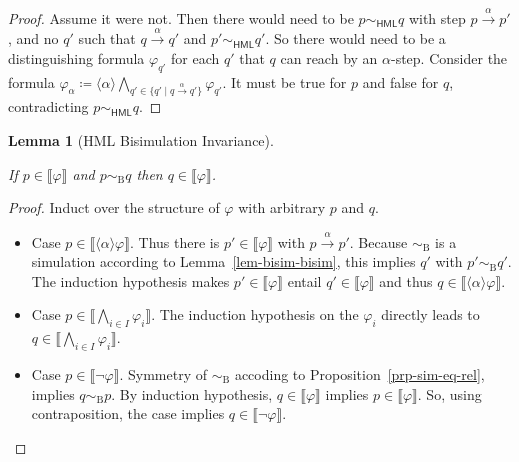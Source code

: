 \documentclass[
  a4paper,
]{report}
\providecommand{\tightlist}{%
  \setlength{\itemsep}{0pt}\setlength{\parskip}{0pt}}\usepackage{longtable,booktabs,array}
\theoremstyle{plain}
\theoremstyle{plain}
\theoremstyle{definition}
\theoremstyle{plain}
\newtheorem{lemma}{Lemma}[section]
\theoremstyle{definition}
\theoremstyle{remark}
\begin{document}
\begin{proof}
Assume it were not. Then there would need to be
\(p \sim_{\textsf{HML}} q\) with step \(p \xrightarrow{\alpha }p'\), and
no \(q'\) such that \(q \xrightarrow{α} q'\) and
\(p' \sim_{\textsf{HML}} q'\). So there would need to be a
distinguishing formula \(φ_{q'}\) for each \(q'\) that \(q\) can reach
by an \(α\)-step. Consider the formula
\(φ_α ≔ \langle α \rangle\textstyle\bigwedge_{q' \in \{q' \mid q \xrightarrow{α} q'\}} φ_{q'}\).
It must be true for \(p\) and false for \(q\), contradicting
\(p \sim_{\textsf{HML}} q\).
\end{proof}

\begin{lemma}[HML Bisimulation
Invariance]\protect\hypertarget{lem-hml-eq-bisim-invariant}{}\label{lem-hml-eq-bisim-invariant}

If \(p \in \llbracket φ \rrbracket\) and \(p \sim_\mathrm{B} q\) then
\(q \in \llbracket φ \rrbracket\).

\end{lemma}

\begin{proof}
Induct over the structure of \(φ\) with arbitrary \(p\) and \(q\).

\begin{itemize}
\tightlist
\item
  Case \(p ∈ \llbracket \langle α \rangle φ \rrbracket\). Thus there is
  \(p' ∈ \llbracket φ \rrbracket\) with \(p \xrightarrow{α} p'\).
  Because \(\sim_\mathrm{B}\) is a simulation according to
  Lemma~\ref{lem-bisim-bisim}, this implies \(q'\) with
  \(p' \sim_\mathrm{B} q'\). The induction hypothesis makes
  \(p' ∈ \llbracket φ \rrbracket\) entail
  \(q' ∈ \llbracket φ \rrbracket\) and thus
  \(q ∈ \llbracket \langle α \rangle φ \rrbracket\).
\item
  Case \(p ∈ \llbracket \textstyle\bigwedge_{i \in I}φ_i \rrbracket\).
  The induction hypothesis on the \(φ_i\) directly leads to
  \(q ∈ \llbracket \textstyle\bigwedge_{i \in I}φ_i \rrbracket\).
\item
  Case \(p ∈ \llbracket \neg φ \rrbracket\). Symmetry of
  \(\sim_\mathrm{B}\) accoding to Proposition~\ref{prp-sim-eq-rel},
  implies \(q \sim_\mathrm{B} p\). By induction hypothesis,
  \(q ∈ \llbracket φ \rrbracket\) implies
  \(p ∈ \llbracket φ \rrbracket\). So, using contraposition, the case
  implies \(q ∈ \llbracket \neg φ \rrbracket\).
\end{itemize}

\end{proof}
\end{document}
